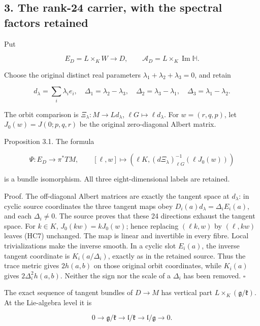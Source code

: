 \documentclass[11pt]{article}
\begin{document}
\subsection*{3. The rank-24 carrier, with the spectral factors retained}

Put

\[
 E_D=L\times_K W\longrightarrow D,\qquad
 \mathcal A_D=L\times_K\operatorname{Im}\mathbb H.
\]

Choose the original distinct real parameters
\(\lambda_1+\lambda_2+\lambda_3=0\), and retain

\[
 d_\lambda=\sum_i\lambda_i e_i,\quad
 \Delta_1=\lambda_2-\lambda_3,\quad
 \Delta_2=\lambda_3-\lambda_1,\quad
 \Delta_3=\lambda_1-\lambda_2.
 \tag{HC6}
\]

The orbit comparison is \(\Xi_\lambda:M\to Ld_\lambda\),
\(\ell G\mapsto\ell d_\lambda\). For \(w=(r,q,p)\), let
\(J_0(w)=J(0;p,q,r)\) be the original zero-diagonal Albert matrix.

Proposition 3.1. The formula

\[
 \Psi:E_D\longrightarrow\pi^*TM,\qquad
 [\ell,w]\longmapsto
 \left(\ell K,(d\Xi_\lambda)^{-1}_{\ell G}
                         (\ell J_0(w))\right)
 \tag{HC7}
\]

is a bundle isomorphism. All three eight-dimensional labels are retained.

Proof. The off-diagonal Albert matrices are exactly the tangent space
at \(d_\lambda\): in cyclic source coordinates the three tangent maps obey
\(D_i(a)d_\lambda=\Delta_iE_i(a)\), and each \(\Delta_i\ne0\).
The source proves that these 24 directions exhaust the tangent space.
For \(k\in K\), \(J_0(kw)=kJ_0(w)\); hence replacing
\((\ell k,w)\) by \((\ell,kw)\) leaves (HC7) unchanged. The map is linear
and invertible in every fibre. Local trivializations make the inverse
smooth. In a cyclic slot \(E_i(a)\), the inverse tangent coordinate is
\(K_i(a/\Delta_i)\), exactly as in the retained source. Thus the trace
metric gives \(2h(a,b)\) on those original orbit coordinates, while
\(K_i(a)\) gives \(2\Delta_i^2h(a,b)\). Neither the sign nor the scale
of a \(\Delta_i\) has been removed. \(\square\)

The exact sequence of tangent bundles of \(D\to M\) has vertical part
\(L\times_K(\mathfrak g/\mathfrak k)\). At the Lie-algebra level it is

\[
 0\longrightarrow\mathfrak g/\mathfrak k
 \longrightarrow\mathfrak l/\mathfrak k
 \longrightarrow\mathfrak l/\mathfrak g\longrightarrow0.
 \tag{HC8}
\]
\end{document}
